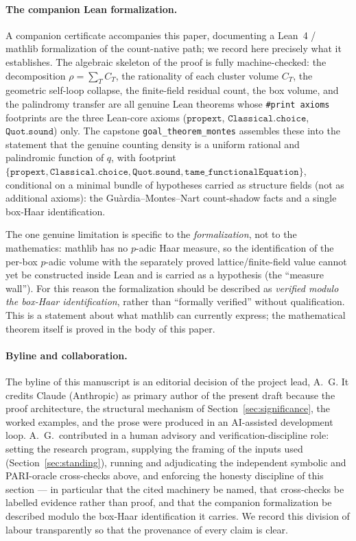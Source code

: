 \documentclass[pdflatex,sn-mathphys-num]{sn-jnl}%
\theoremstyle{plain}
\theoremstyle{definition}
\theoremstyle{remark}
\numberwithin{equation}{section}
\begin{document}
\paragraph{The companion Lean formalization.}
A companion certificate accompanies this paper, documenting a Lean~4 /
\textsf{mathlib} formalization of the count-native path; we record here precisely
what it establishes. The algebraic skeleton of the proof is fully machine-checked:
the decomposition $\rho=\sum_{T}C_{T}$, the rationality of each cluster volume
$C_{T}$, the geometric self-loop collapse, the finite-field residual count, the
box volume, and the palindromy transfer are all genuine Lean theorems whose
\texttt{\#print axioms} footprints are the three Lean-core axioms
($\texttt{propext}$, $\texttt{Classical.choice}$, $\texttt{Quot.sound}$) only. The
capstone \texttt{goal\_theorem\_montes} assembles these into the statement that the
genuine counting density is a uniform rational and palindromic function of $q$,
with footprint $\{\texttt{propext},\texttt{Classical.choice},\texttt{Quot.sound},
\texttt{tame\_functionalEquation}\}$, conditional on a minimal bundle of hypotheses
carried as structure fields (not as additional axioms): the
Gu\`ardia--Montes--Nart count-shadow facts and a single box-Haar identification.

The one genuine limitation is specific to the \emph{formalization}, not to the
mathematics: \textsf{mathlib} has no $p$-adic Haar measure, so the identification of
the per-box $p$-adic volume with the separately proved lattice/finite-field value
cannot yet be constructed inside Lean and is carried as a hypothesis (the ``measure
wall''). For this reason the formalization should be described as \emph{verified
modulo the box-Haar identification}, rather than ``formally verified'' without
qualification. This is a statement about what mathlib can currently express; the
mathematical theorem itself is proved in the body of this paper.

\paragraph{Byline and collaboration.}
The byline of this manuscript is an editorial decision of the project lead,
A.~G. It credits Claude (Anthropic) as primary author of the present draft because
the proof architecture, the structural mechanism of Section~\ref{sec:significance}, the
worked examples, and the prose were produced in an AI-assisted development loop.
A.~G.\ contributed in a human advisory and verification-discipline role: setting
the research program, supplying the framing of the inputs used
(Section~\ref{sec:standing}), running and adjudicating the independent symbolic
and PARI-oracle cross-checks above, and enforcing the honesty discipline of this
section --- in particular that the cited machinery be named, that cross-checks be
labelled evidence rather than proof, and that the companion formalization be
described modulo the box-Haar identification it carries. We record this
division of labour transparently so that the provenance of every claim is clear.


\end{document}
